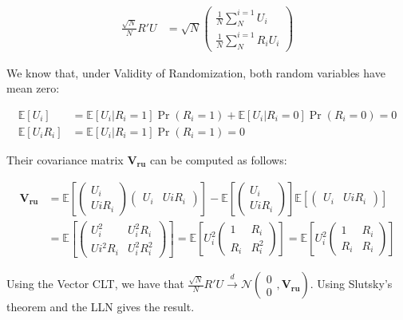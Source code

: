 \documentclass[]{book}
\newcommand{\esp}[1]{\mathbb{E}[ #1 ]}
\theoremstyle{definition}
\theoremstyle{definition}
\theoremstyle{definition}
\theoremstyle{remark}
\begin{document}
\begin{align*}
\frac{\sqrt{N}}{N}R'U & = \sqrt{N}\left(\begin{array}{c}  \frac{1}{N}\sum^{i=1}_{N}U_i\\  \frac{1}{N}\sum^{i=1}_{N}R_iU_i\end{array}\right)
\end{align*}

We know that, under Validity of Randomization, both random variables have mean zero:

\begin{align*}
\esp{U_i}& = \esp{U_i|R_i=1}\Pr(R_i=1)+\esp{U_i|R_i=0}\Pr(R_i=0)=0 \\
\esp{U_iR_i}& = \esp{U_i|R_i=1}\Pr(R_i=1)=0
\end{align*}

Their covariance matrix \(\mathbf{V_{ru}}\) can be computed as follows:

\begin{align*}
\mathbf{V_{ru}} & = \esp{\left(\begin{array}{c}  U_i\\  UiR_i\end{array}\right)\left(\begin{array}{cc}  U_i&    UiR_i\end{array}\right)}
                  - \esp{\left(\begin{array}{c} U_i\\   UiR_i\end{array}\right)}\esp{\left(\begin{array}{cc}    U_i&    UiR_i\end{array}\right)}\\
                & = \esp{\left(\begin{array}{cc}    U_i^2 & U_i^2R_i\\  Ui^2R_i & U_i^2R_i^2\end{array}\right)} 
                  = \esp{U_i^2\left(\begin{array}{cc}   1 & R_i\\   R_i & R_i^2\end{array}\right)} 
                  = \esp{U_i^2\left(\begin{array}{cc}   1 & R_i\\   R_i & R_i\end{array}\right)} 
\end{align*}

Using the Vector CLT, we have that \(\frac{\sqrt{N}}{N}R'U\stackrel{d}{\rightarrow}\mathcal{N}\left(\begin{array}{c} 0\\ 0\end{array},\mathbf{V_{ru}}\right)\).
Using Slutsky's theorem and the LLN gives the result.
\end{document}
